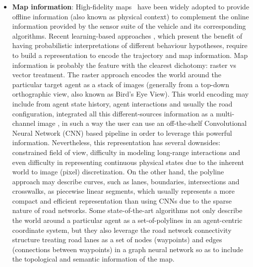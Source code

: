 \begin{itemize}
	\item \textbf{Map information}: High-fidelity maps~\cite{can2022maps} have been widely adopted to provide offline information (also known as physical context) to complement the online information provided by the sensor suite of the vehicle and its corresponding algorithms. Recent learning-based approaches \cite{mahjourian2022occupancy, casas2018intentnet, ivanovic2021heterogeneous}, which present the benefit of having probabilistic interpretations of different behaviour hypotheses, require to build a representation to encode the trajectory and map information. Map information is probably the feature with the clearest dichotomy: raster vs vector treatment. The raster approach encodes the world around the particular target agent as a stack of images (generally from a top-down orthographic view, also known as Bird's Eye View). This world encoding may include from agent state history, agent interactions and usually the road configuration, integrated all this different-sources information as a multi-channel image \cite{gilles2021home}, in such a way the user can use an off-the-shelf Convolutional Neural Network (CNN) based pipeline in order to leverage this powerful information. Nevertheless, this representation has several downsides: constrained field of view, difficulty in modeling long-range interactions and even difficulty in representing continuous physical states due to the inherent world to image (pixel) discretization. On the other hand, the polyline approach may describe curves, such as lanes, boundaries, intersections and crosswalks, as piecewise linear segments, which usually represents a more compact and efficient representation than using CNNs due to the sparse nature of road networks. Some state-of-the-art algorithms not only describe the world around a particular agent as a set-of-polylines \cite{khandelwal2020if} \cite{zhao2020tnt} in an agent-centric coordinate system, but they also leverage the road network connectivity structure \cite{liang2020learninggraph} \cite{zeng2021lanercnn} treating road lanes as a set of nodes (waypoints) and edges (connections between waypoints) in a graph neural network so as to include the topological and semantic information of the map.
	
	

\end{itemize}
